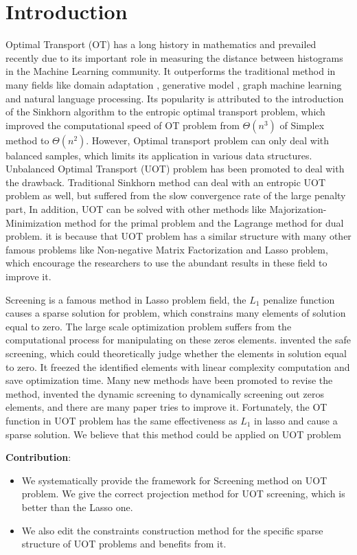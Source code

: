 \section{Introduction}
Optimal Transport (OT) has a long history in mathematics and prevailed recently due to its important role in measuring the distance between histograms in the Machine Learning community. It outperforms the traditional method in many fields like domain adaptation \citep{7586038}, generative model \citep{arjovsky2017wasserstein}, graph machine learning \citep{NEURIPS2019_fdd5b16f} and natural language processing. \citep{084adf2f555549c493e0331a00e4ecad} Its popularity is attributed to the introduction of the Sinkhorn algorithm to the entropic optimal transport problem, \citep{NIPS2013_af21d0c9} which improved the computational speed of OT problem from $\Theta (n^3)$ of Simplex method to $\Theta (n^2)$. However, Optimal transport problem can only deal with balanced samples, which limits its application in various data structures. Unbalanced Optimal Transport (UOT) problem has been promoted to deal with the drawback. Traditional Sinkhorn method can deal with an entropic UOT problem as well, but suffered from the slow convergence rate of the large penalty part, In addition, UOT can be solved with other methods like Majorization-Minimization method for the primal problem and the Lagrange method for dual problem\citep{NEURIPS2021_c3c617a9}. it is because that UOT problem has a similar structure with many other famous problems like Non-negative Matrix Factorization and Lasso problem, which encourage the researchers to use the abundant results in these field to improve it.

Screening is a famous method in Lasso problem field, the $L_1$ penalize function causes a sparse solution for problem, which constrains many elements of solution equal to zero. The large scale optimization problem suffers from the computational process for manipulating on these zeros elements. \citep{ghaoui2010safe} invented the safe screening, which could theoretically judge whether the elements in solution equal to zero. It freezed the identified elements with linear complexity computation and save optimization time. Many new methods have been promoted to revise the method, \citep{JMLR:v18:16-577} invented the dynamic screening to dynamically screening out zeros elements, and there are many paper tries to improve it.  
Fortunately, the OT function in UOT problem has the same effectiveness as $L_1$ in lasso and cause a sparse solution. We believe that this method could be applied on UOT problem

\textbf{Contribution}: 
\begin{itemize}
\item We systematically provide the framework for Screening method on UOT problem. We give the correct projection method for UOT screening, which is better than the Lasso one. 
\item We also edit the constraints construction method for the specific sparse structure of UOT problems and benefits from it.
\end{itemize}



